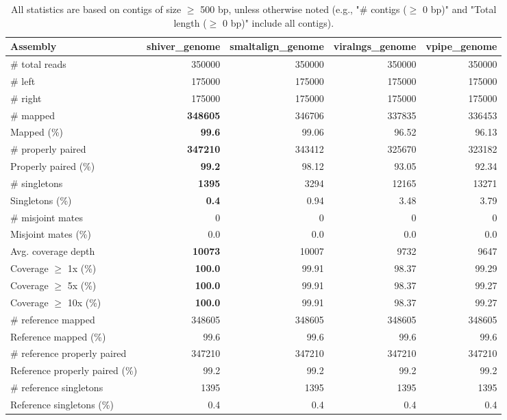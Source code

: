 \documentclass[12pt,a4paper]{article}
\begin{document}
\begin{table}[ht]
\begin{center}
\caption{All statistics are based on contigs of size $\geq$ 500 bp, unless otherwise noted (e.g., "\# contigs ($\geq$ 0 bp)" and "Total length ($\geq$ 0 bp)" include all contigs).}
\begin{tabular}{|l*{4}{|r}|}
\hline
Assembly & shiver\_genome & smaltalign\_genome & viralngs\_genome & vpipe\_genome \\ \hline
\# total reads & 350000 & 350000 & 350000 & 350000 \\ \hline
\# left & 175000 & 175000 & 175000 & 175000 \\ \hline
\# right & 175000 & 175000 & 175000 & 175000 \\ \hline
\# mapped & {\bf 348605} & 346706 & 337835 & 336453 \\ \hline
Mapped (\%) & {\bf 99.6} & 99.06 & 96.52 & 96.13 \\ \hline
\# properly paired & {\bf 347210} & 343412 & 325670 & 323182 \\ \hline
Properly paired (\%) & {\bf 99.2} & 98.12 & 93.05 & 92.34 \\ \hline
\# singletons & {\bf 1395} & 3294 & 12165 & 13271 \\ \hline
Singletons (\%) & {\bf 0.4} & 0.94 & 3.48 & 3.79 \\ \hline
\# misjoint mates & 0 & 0 & 0 & 0 \\ \hline
Misjoint mates (\%) & 0.0 & 0.0 & 0.0 & 0.0 \\ \hline
Avg. coverage depth & {\bf 10073} & 10007 & 9732 & 9647 \\ \hline
Coverage $\geq$ 1x (\%) & {\bf 100.0} & 99.91 & 98.37 & 99.29 \\ \hline
Coverage $\geq$ 5x (\%) & {\bf 100.0} & 99.91 & 98.37 & 99.27 \\ \hline
Coverage $\geq$ 10x (\%) & {\bf 100.0} & 99.91 & 98.37 & 99.27 \\ \hline
\# reference mapped & 348605 & 348605 & 348605 & 348605 \\ \hline
Reference mapped (\%) & 99.6 & 99.6 & 99.6 & 99.6 \\ \hline
\# reference properly paired & 347210 & 347210 & 347210 & 347210 \\ \hline
Reference properly paired (\%) & 99.2 & 99.2 & 99.2 & 99.2 \\ \hline
\# reference singletons & 1395 & 1395 & 1395 & 1395 \\ \hline
Reference singletons (\%) & 0.4 & 0.4 & 0.4 & 0.4 \\ \hline

\end{tabular}
\end{center}
\end{table}
\end{document}
